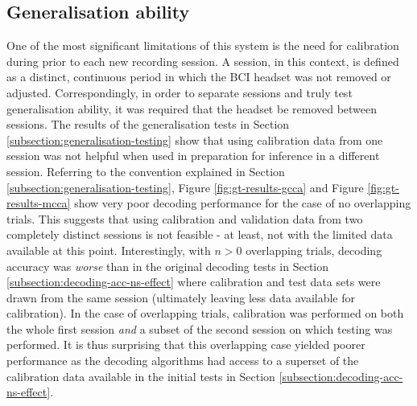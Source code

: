 \subsection{Generalisation ability}
\label{subsection:generaliation-discussion}
One of the most significant limitations of this system is the need for calibration during prior to each new recording session. A session, in this context, is defined as a distinct, continuous period in which the BCI headset was not removed or adjusted. Correspondingly, in order to separate sessions and truly test generalisation ability, it was required that the headset be removed between sessions. The results of the generalisation tests in Section \ref{subsection:generalisation-testing} show that using calibration data from one session was not helpful when used in preparation for inference in a different session. Referring to the convention explained in Section \ref{subsection:generalisation-testing}, Figure \ref{fig:gt-results-gcca} and Figure \ref{fig:gt-results-mcca} show very poor decoding performance for the case of no overlapping trials. This suggests that using calibration and validation data from two completely distinct sessions is not feasible - at least, not with the limited data available at this point. Interestingly, with $n>0$ overlapping trials, decoding accuracy was \textit{worse} than in the original decoding tests in Section \ref{subsection:decoding-acc-ns-effect} where calibration and test data sets were drawn from the same session (ultimately leaving less data available for calibration). In the case of overlapping trials, calibration was performed on both the whole first session \textit{and} a subset of the second session on which testing was performed. It is thus surprising that this overlapping case yielded poorer performance as the decoding algorithms had access to a superset of the calibration data available in the initial tests in Section \ref{subsection:decoding-acc-ns-effect}. 

